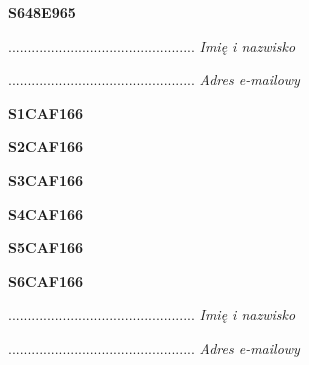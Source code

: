 \begin{turn}{90}\huge \textbf{S648E965}\end{turn}

\begin{turn}{90}\begin{minipage}{\linewidth} \vspace{20mm} ................................................  \textit{Imię i nazwisko}\end{minipage}\end{turn}

\begin{turn}{90}\begin{minipage}{\linewidth} \vspace{20mm} ................................................  \textit{Adres e-mailowy}\end{minipage}\end{turn}

\begin{turn}{90}\huge \textbf{S1CAF166}\end{turn}

\begin{turn}{90}\huge \textbf{S2CAF166}\end{turn}

\begin{turn}{90}\huge \textbf{S3CAF166}\end{turn}

\begin{turn}{90}\huge \textbf{S4CAF166}\end{turn}

\begin{turn}{90}\huge \textbf{S5CAF166}\end{turn}

\begin{turn}{90}\huge \textbf{S6CAF166}\end{turn}

\begin{turn}{90}\begin{minipage}{\linewidth} \vspace{20mm} ................................................  \textit{Imię i nazwisko}\end{minipage}\end{turn}

\begin{turn}{90}\begin{minipage}{\linewidth} \vspace{20mm} ................................................  \textit{Adres e-mailowy}\end{minipage}\end{turn}

